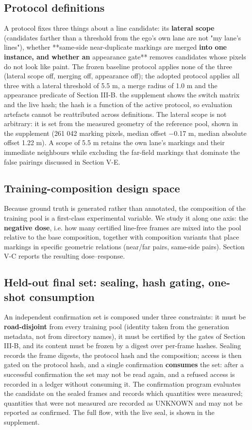 \documentclass[journal]{IEEEtran}
\begin{document}
\subsection{Protocol definitions}
A protocol fixes three things about a line candidate: its \textbf{lateral scope} (candidates farther than
a threshold from the ego's own lane are not "my lane's lines"), whether **same-side near-duplicate
markings are merged\textbf{ into one instance, and whether an }appearance gate** removes candidates whose
pixels do not look like paint. The frozen baseline protocol applies none of the three (lateral scope
off, merging off, appearance off); the adopted protocol applies all three with a lateral threshold of
5.5 m, a merge radius of 1.0 m and the appearance predicate of Section III-B. the supplement shows the
switch matrix and the live hash; the hash is a function of the active protocol, so evaluation
artefacts cannot be reattributed across definitions.
The lateral scope is not arbitrary: it is set from the measured geometry of the reference pool, shown in the supplement (261 042 marking pixels, median offset −0.17 m, median absolute offset 1.22 m). A scope of 5.5 m retains the own lane's markings and their immediate neighbours while excluding the far-field markings that dominate the false pairings discussed in Section V-E.
\subsection{Training-composition design space}
Because ground truth is generated rather than annotated, the composition of the training pool is a
first-class experimental variable. We study it along one axis: the \textbf{negative dose}, i.e. how many
certified line-free frames are mixed into the pool relative to the base composition, together with
composition variants that place markings in specific geometric relations (near/far pairs, same-side
pairs). Section V-C reports the resulting dose--response.
\subsection{Held-out final set: sealing, hash gating, one-shot consumption}
An independent confirmation set is composed under three constraints: it must be \textbf{road-disjoint}
from every training pool (identity taken from the generation metadata, not from directory names), it
must be certified by the gates of Section III-B, and its content must be frozen by a digest over
per-frame hashes. Sealing records the frame digests, the protocol hash and the composition; access
is then gated on the protocol hash, and a single confirmation \textbf{consumes} the set: after a
successful confirmation the set may not be read again, and a refused access is recorded in a ledger
without consuming it. The confirmation program evaluates the candidate on the sealed frames and
records which quantities were measured; quantities that were not measured are recorded as UNKNOWN
and may not be reported as confirmed. The full flow, with the live seal, is shown in the supplement.
\end{document}
